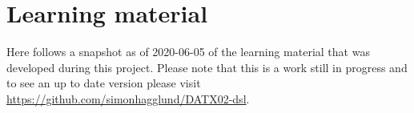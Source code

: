 \documentclass[final]{article}
\begin{document}
\newpage
\printbibliography
\newpage
\appendix

\section{Learning material}\label{app_learning_material}
Here follows a snapshot as of 2020-06-05 of the learning material that was developed during this project. Please note that this is a work still in progress and to see an up to date version please visit \url{https://github.com/simonhagglund/DATX02-dsl}.



%


\end{document}
